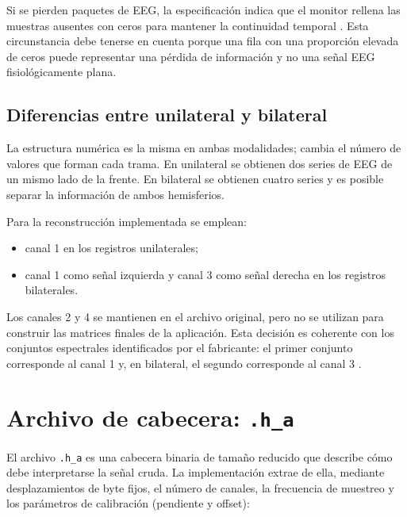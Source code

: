 \documentclass[
  spanish,
  a4paper,
  12pt,
  twoside]{memoir}
\providecommand{\tightlist}{%
  \setlength{\itemsep}{0pt}\setlength{\parskip}{0pt}}
\begin{document}
Si se pierden paquetes de EEG, la especificación indica que el monitor
rellena las muestras ausentes con ceros para mantener la continuidad
temporal \citep{CovidienSerial2010}. Esta circunstancia debe tenerse en
cuenta porque una fila con una proporción elevada de ceros puede
representar una pérdida de información y no una señal EEG
fisiológicamente plana.

\section{Diferencias entre unilateral y
bilateral}\label{diferencias-entre-unilateral-y-bilateral}

La estructura numérica es la misma en ambas modalidades; cambia el
número de valores que forman cada trama. En unilateral se obtienen dos
series de EEG de un mismo lado de la frente. En bilateral se obtienen
cuatro series y es posible separar la información de ambos hemisferios.

Para la reconstrucción implementada se emplean:

\begin{itemize}
\tightlist
\item
  canal 1 en los registros unilaterales;
\item
  canal 1 como señal izquierda y canal 3 como señal derecha en los
  registros bilaterales.
\end{itemize}

Los canales 2 y 4 se mantienen en el archivo original, pero no se
utilizan para construir las matrices finales de la aplicación. Esta
decisión es coherente con los conjuntos espectrales identificados por el
fabricante: el primer conjunto corresponde al canal 1 y, en bilateral,
el segundo corresponde al canal 3 \citep{CovidienSerial2010}.

\chapter{\texorpdfstring{Archivo de cabecera:
\texttt{.h\_a}}{Archivo de cabecera: .h\_a}}\label{archivo-de-cabecera-.h_a}

El archivo \texttt{.h\_a} es una cabecera binaria de tamaño reducido que
describe cómo debe interpretarse la señal cruda. La implementación
extrae de ella, mediante desplazamientos de byte fijos, el número de
canales, la frecuencia de muestreo y los parámetros de calibración
(pendiente y offset):
\end{document}
